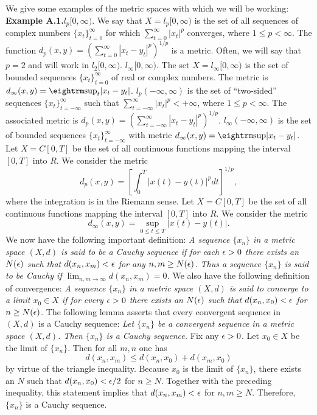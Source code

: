 We give some examples of the metric spaces with which we will be working:
\medskip
\noindent
{\bf Example A.1.}\quad  $l_p[0,\infty)$.  We say that $X=l_p[0,\infty)$ is
the set of all sequences of complex numbers $\{x_t\}_{t=0}^\infty$ for which
$\sum_{t=0}^\infty |x_t|^p$ converges, where $1\le p<\infty$.  The function
$d_p(x,y)=(\sum_{t=0}^\infty |x_t-y_t|^p)^{1/p}$ is a metric.  Often, we will
say that $p=2$ and will work in $l_2[0,\infty)$.
\medskip
{}\quad  $l_\infty[0,\infty)$.  The set
$X=l_\infty[0,\infty)$ is the set of bounded sequences $\{x_t\}_{t=0}^\infty$
of real or complex numbers.  The metric is $d_\infty(x,y) = {\rm
sup}_t|x_t-y_t|$.
\medskip
{}\quad $l_p(-\infty,\infty)$ is the set
of ``two-sided''
sequences $\{x_t\}_{t=-\infty}^\infty$ such that $\sum_{t=-\infty}^\infty
|x_t|^p<+\infty$, where $1\le p<\infty$.  The associated metric is $d_p(x,y) =
(\sum_{t=-\infty}^\infty |x_t-y_t|^p)^{1/p}$.
\medskip
{}\quad $l_\infty(-\infty,\infty)$ is the
set of bounded
sequences $\{x_t\}_{t=-\infty}^\infty$ with metric $d_\infty(x,y)={\rm sup}
|x_t-y_t|$.
\medskip
{}\quad  Let $X=C[0,T]$ be the set of all continuous
functions mapping the interval $[0,T]$ into $R$.  We consider the metric
$$d_p(x,y) = \left[ \int_0^T |x(t) -y(t)|^p dt\right]^{1/p},$$
where the integration is in the Riemann sense.
\medskip
{}\quad  Let $X=C[0,T]$ be the set of all continuous
functions mapping the interval $[0,T]$ into $R$.  We consider the metric
$$d_\infty(x,y) =\sup\limits_{0\le t\le T} |x(t)-y(t)|.$$
\medskip
We now have the following important definition:
\medskip
{\it A sequence $\{x_n\}$ in a metric space $(X,d)$
is said to be a Cauchy sequence if for each ${\epsilon}>0$ there exists an $N({\epsilon})$
such that $d(x_n,x_m)<{\epsilon}$ for any $n,m\ge N({\epsilon})$.  Thus a sequence
$\{x_n\}$ is said to be Cauchy if $\lim_{n,m\to\infty} d(x_n,x_m)=0$.}
\enddefinition
\medskip
We also have the following definition of convergence:
\medskip
{\it A sequence $\{x_n\}$ in a metric space $(X,d)$
is said to converge to a limit $x_0\in X$ if for every ${\epsilon}>0$ there exists an
$N({\epsilon})$ such that $d(x_n,x_0)<{\epsilon}$ for $n\ge N({\epsilon})$.}
\enddefinition
\medskip
The following lemma asserts that every convergent sequence in $(X,d)$ is a
Cauchy sequence:
\medskip
{}  {\it Let $\{x_n\}$ be a convergent sequence in a metric
space $(X,d)$. Then $\{x_n\}$ is a Cauchy sequence.}\endlemma
\medskip
\proof Fix any ${\epsilon}>0$.  Let $x_0 \in X$
 be the limit of $\{x_n\}$.  Then for
all $m,n$ one has
$$d(x_n,x_m)\le d(x_n,x_0)+d(x_m,x_0)$$
by virtue of the triangle inequality.  Because $x_0$ is the limit of $\{x_n\}$,
there exists an $N$ such that $d(x_n,x_0)<{\epsilon}/2$ for $n\ge N$.  Together with
the preceding inequality, this statement implies that $d(x_n,x_m)<{\epsilon}$
 for $n,m\ge N$.  Therefore, $\{x_n\}$ is a Cauchy sequence.  \endproof %
\medskip

